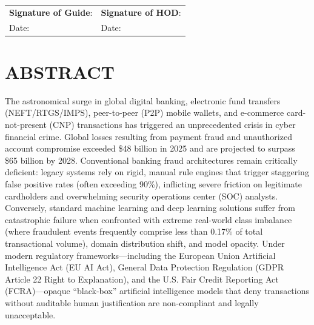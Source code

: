 \documentclass[12pt,a4paper,oneside]{report}
\begin{document}
\vspace{2.5cm}
\noindent
\begin{tabular}{p{3.0in}p{3.0in}}
\textbf{Signature of Guide}: \hrulefill & \textbf{Signature of HOD}: \hrulefill \\
Date: & Date: \\
\end{tabular}

\newpage

\chapter*{ABSTRACT}
\thispagestyle{plain}
The astronomical surge in global digital banking, electronic fund transfers (NEFT/RTGS/IMPS), peer-to-peer (P2P) mobile wallets, and e-commerce card-not-present (CNP) transactions has triggered an unprecedented crisis in cyber financial crime. Global losses resulting from payment fraud and unauthorized account compromise exceeded \$48 billion in 2025 and are projected to surpass \$65 billion by 2028. Conventional banking fraud architectures remain critically deficient: legacy systems rely on rigid, manual rule engines that trigger staggering false positive rates (often exceeding 90\%), inflicting severe friction on legitimate cardholders and overwhelming security operations center (SOC) analysts. Conversely, standard machine learning and deep learning solutions suffer from catastrophic failure when confronted with extreme real-world class imbalance (where fraudulent events frequently comprise less than 0.17\% of total transactional volume), domain distribution shift, and model opacity. Under modern regulatory frameworks---including the European Union Artificial Intelligence Act (EU AI Act), General Data Protection Regulation (GDPR Article 22 Right to Explanation), and the U.S. Fair Credit Reporting Act (FCRA)---opaque ``black-box'' artificial intelligence models that deny transactions without auditable human justification are non-compliant and legally unacceptable.
\end{document}

